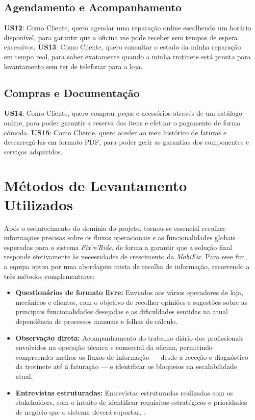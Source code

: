 \documentclass[a4paper,12pt]{scrreprt}
\begin{document}
\subsection{Agendamento e Acompanhamento}
\textbf{US12}: Como Cliente, quero agendar uma reparação online escolhendo um horário disponível, para garantir que a oficina me pode receber sem tempos de espera excessivos. \textbf{US13}: Como Cliente, quero consultar o estado da minha reparação em tempo real, para saber exatamente quando a minha trotinete está pronta para levantamento sem ter de telefonar para a loja. 

\subsection{Compras e Documentação}
\textbf{US14}: Como Cliente, quero comprar peças e acessórios através de um catálogo online, para poder garantir a reserva dos itens e efetuar o pagamento de forma cómoda. \textbf{US15}: Como Cliente, quero aceder ao meu histórico de faturas e descarregá-las em formato PDF, para poder gerir as garantias dos componentes e serviços adquiridos. 

\section{Métodos de Levantamento Utilizados}
Após o esclarecimento do domínio do projeto, tornou-se essencial recolher informações precisas sobre os fluxos operacionais e as funcionalidades globais esperadas para o sistema \textit{Fix'n'Ride}, de forma a garantir que a solução final responde efetivamente às necessidades de crescimento da \textit{MobiFix}. Para esse fim, a equipa optou por uma abordagem mista de recolha de informação, recorrendo a três métodos complementares:

\begin{itemize}
    \item \textbf{Questionários de formato livre:} Enviados aos vários operadores de loja, mecânicos e clientes, com o objetivo de recolher opiniões e sugestões sobre as principais funcionalidades desejadas e as dificuldades sentidas na atual dependência de processos manuais e folhas de cálculo.
    \item \textbf{Observação direta:} Acompanhamento do trabalho diário dos profissionais envolvidos na operação técnica e comercial da oficina, permitindo compreender melhor os fluxos de informação — desde a receção e diagnóstico da trotinete até à faturação — e identificar os bloqueios na escalabilidade atual.
    \item \textbf{Entrevistas estruturadas:} Entrevistas estruturadas realizadas com os stakeholders, com o intuito de identificar requisitos estratégicos e prioridades de negócio que o sistema deverá suportar.
    .
\end{itemize}
\end{document}
